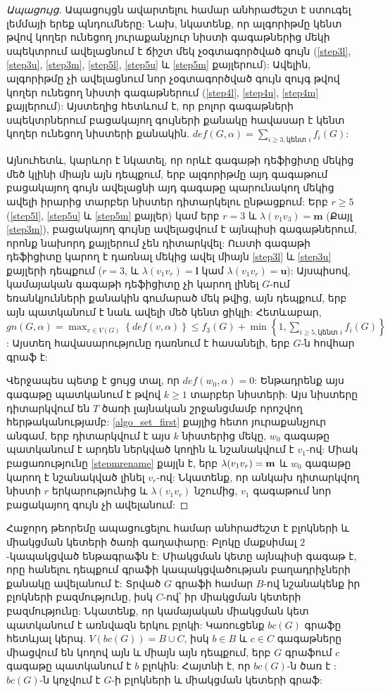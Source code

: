 \begin{proof}[Ապացույց]
Ապացույցն ավարտելու համար անհրաժեշտ է ստուգել լեմմայի երեք պնդումները: Նախ, նկատենք, որ ալգորիթմը կենտ թվով կողեր ունեցող յուրաքանչյուր նիստի գագաթներից մեկի սպեկտրում ավելացնում է ճիշտ մեկ չօգտագործված գույն (\ref{step3l}, \ref{step3u}, \ref{step3m}, \ref{step5l}, \ref{step5u} և \ref{step5m} քայլերում): Ավելին, ալգորիթմը չի ավելացնում նոր չօգտագործված գույն զույգ թվով կողեր ունեցող նիստի գագաթներում (\ref{step4l}, \ref{step4u}, \ref{step4m} քայլերում): Այստեղից հետևում է, որ բոլոր գագաթների սպեկտրներում բացակայող գույների քանակը հավասար է կենտ կողեր ունեցող նիստերի քանակին. $def(G,\alpha) = \sum_{i\geq 3,\text{կենտ }i}{f_i(G)}$:

Այնուհետև, կարևոր է նկատել, որ որևէ գագաթի դեֆիցիտը մեկից մեծ կլինի միայն այն դեպքում, երբ ալգորիթմը այդ գագաթում բացակայող գույն ավելացնի այդ գագաթը պարունակող մեկից ավելի իրարից տարբեր նիստեր դիտարկելու ընթացքում: Երբ $r \geq 5$ (\ref{step5l}, \ref{step5u} և \ref{step5m} քայլեր) կամ երբ $r=3$ և $\lambda(v_1v_3)=\bm{m}$ (Քայլ \ref{step3m}), բացակայող գույնը ավելացվում է այնպիսի գագաթներում, որոնք նախորդ քայլերում չեն դիտարկվել: Ուստի գագաթի դեֆիցիտը կարող է դառնալ մեկից ավել միայն \ref{step3l} և \ref{step3u} քայլերի դեպքում ($r=3$, և $\lambda(v_1v_r)=\bm{l}$ կամ $\lambda(v_1v_r)=\bm{u}$): Այսպիսով, կամայական գագաթի դեֆիցիտը չի կարող լինել $G$-ում եռանկյունների քանակին գումարած մեկ թվից, այն դեպքում, երբ այն պատկանում է նաև ավելի մեծ կենտ ցիկլի: Հետևաբար, $gn(G,\alpha) = \max_{v\in V(G)}{\left\{def(v,\alpha)\right\}} \leq f_3(G) + \min\left\{1, \sum_{i\geq 5,\text{կենտ }i}{f_i(G)}\right\}$: Այստեղ հավասարությունը դառնում է հասանելի, երբ $G$-ն հովհար գրաֆ է:

Վերջապես պետք է ցույց տալ, որ $def(w_0, \alpha)=0$: Ենթադրենք այս գագաթը պատկանում է թվով $k \geq 1$ տարբեր նիստերի: Այս նիստերը դիտարկվում են $T$ ծառի լայնական շրջանցմամբ որոշվող հերթականությամբ: \ref{algo_set_first} քայլից հետո յուրաքանչյուր անգամ, երբ դիտարկվում է այս $k$ նիստերից մեկը, $w_0$ գագաթը պատկանում է արդեն ներկված կողին և նշանակվում է $v_1$-ով: Միակ բացառությունը \ref{stepmrename} քայլն է, երբ $\lambda(v_1v_r)= \bf{m}$ և $w_0$ գագաթը կարող է նշանակված լինել $v_r$-ով: Նկատենք, որ անկախ դիտարկվող նիստի $r$ երկարությունից և $\lambda(v_1v_r)$ նշումից, $v_1$ գագաթում նոր բացակայող գույն չի ավելանում:
\end{proof}

Հաջորդ թեորեմը ապացուցելու համար անհրաժեշտ է բլոկների և միակցման կետերի ծառի գաղափարը: Բլոկը մաքսիմալ $2$-կապակցված ենթագրաֆն է: Միակցման կետը այնպիսի գագաթ է, որը հանելու դեպքում գրաֆի կապակցվածության բաղադրիչների քանակը ավելանում է: Տրված $G$ գրաֆի համար $B$-ով նշանակենք իր բլոկների բազմությունը, իսկ $C$-ով՝ իր միակցման կետերի բազմությունը: Նկատենք, որ կամայական միակցման կետ պատկանում է առնվազն երկու բլոկի: Կառուցենք $bc(G)$ գրաֆը հետևյալ կերպ. $V(bc(G)) = B \cup C$, իսկ $b \in B$ և $c \in C$ գագաթները միացվում են կողով այն և միայն այն դեպքում, երբ $G$ գրաֆում $c$ գագաթը պատկանում է $b$ բլոկին: Հայտնի է, որ $bc(G)$-ն ծառ է \cite{Harary1969}: $bc(G)$-ն կոչվում է $G$-ի բլոկների և միակցման կետերի գրաֆ:

